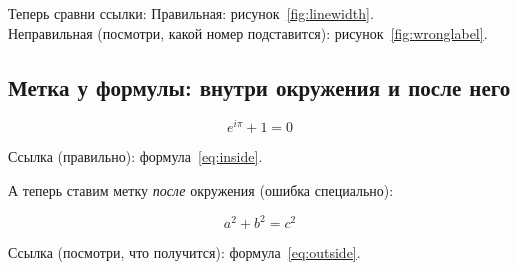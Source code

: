 \documentclass[a4paper,12pt]{article}
\begin{document}
Теперь сравни ссылки:
Правильная: рисунок~\ref{fig:linewidth}. \\
Неправильная (посмотри, какой номер подставится): рисунок~\ref{fig:wronglabel}.

\subsection{ Метка у формулы: внутри окружения и после него}
\begin{equation}
e^{i\pi}+1 = 0
\label{eq:inside}
\end{equation}

Ссылка (правильно): формула~\ref{eq:inside}.

А теперь ставим метку \emph{после} окружения (ошибка специально):

\begin{equation}
a^2 + b^2 = c^2
\end{equation}
\label{eq:outside}

Ссылка (посмотри, что получится): формула~\ref{eq:outside}.
\end{document}
